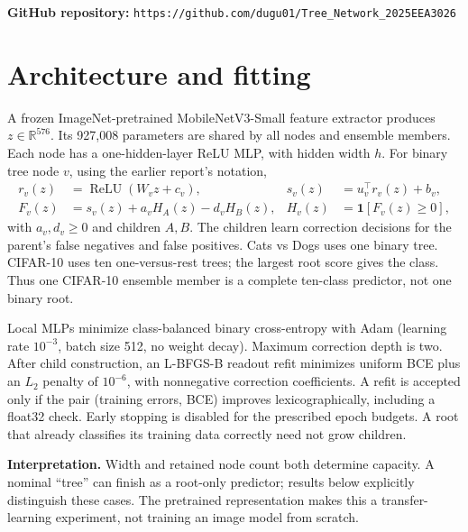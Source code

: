 \documentclass[11pt,a4paper]{article}
\begin{document}
\textbf{GitHub repository:} \texttt{https://github.com/dugu01/Tree\_Network\_2025EEA3026}

\section{Architecture and fitting}
A frozen ImageNet-pretrained MobileNetV3-Small feature extractor produces $z\in\mathbb R^{576}$. Its 927,008 parameters are shared by all nodes and ensemble members. Each node has a one-hidden-layer ReLU MLP, with hidden width $h$. For binary tree node $v$, using the earlier report's notation,
\begin{align*}
 r_v(z)&=\operatorname{ReLU}(W_vz+c_v), & s_v(z)&=u_v^\top r_v(z)+b_v,\\
 F_v(z)&=s_v(z)+a_vH_A(z)-d_vH_B(z), & H_v(z)&=\mathbf1[F_v(z)\geq0],
\end{align*}
with $a_v,d_v\geq0$ and children $A,B$. The children learn correction decisions for the parent's false negatives and false positives. Cats vs Dogs uses one binary tree. CIFAR-10 uses ten one-versus-rest trees; the largest root score gives the class. Thus one CIFAR-10 ensemble member is a complete ten-class predictor, not one binary root.

Local MLPs minimize class-balanced binary cross-entropy with Adam (learning rate $10^{-3}$, batch size 512, no weight decay). Maximum correction depth is two. After child construction, an L-BFGS-B readout refit minimizes uniform BCE plus an $L_2$ penalty of $10^{-6}$, with nonnegative correction coefficients. A refit is accepted only if the pair (training errors, BCE) improves lexicographically, including a float32 check. Early stopping is disabled for the prescribed epoch budgets. A root that already classifies its training data correctly need not grow children.

\textbf{Interpretation.} Width and retained node count both determine capacity. A nominal ``tree'' can finish as a root-only predictor; results below explicitly distinguish these cases. The pretrained representation makes this a transfer-learning experiment, not training an image model from scratch.
\end{document}
